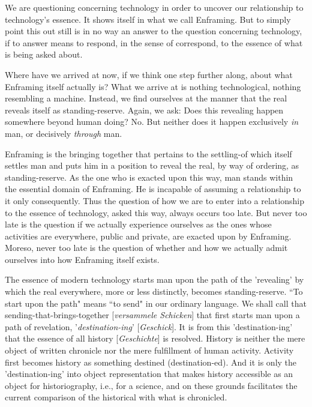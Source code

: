 \documentclass[12pt]{article}
\begin{document}
We are questioning concerning technology in order to uncover our relationship to technology's essence. It shows itself in what we call Enframing. But to simply point this out still is in no way an answer to the question concerning technology, if to answer means to respond, in the sense of correspond, to the essence of what is being asked about.

Where have we arrived at now, if we think one step further along, about what Enframing itself actually is? What we arrive at is nothing technological, nothing resembling a machine. Instead, we find ourselves at the manner that the real reveals itself as standing-reserve. Again, we ask: Does this revealing happen somewhere beyond human doing? No. But neither does it happen exclusively \textit{in} man, or decisively \textit{through} man.

Enframing is the bringing together that pertains to the settling-of which itself settles man and puts him in a position to reveal the real, by way of ordering, as standing-reserve. As the one who is exacted upon this way, man stands within the essential domain of Enframing. He is incapable of assuming a relationship to it only consequently. Thus the question of how we are to enter into a relationship to the essence of technology, asked this way, always occurs too late. But never too late is the question if we actually experience ourselves as the ones whose activities are everywhere, public and private, are exacted upon by Enframing. Moreso, never too late is the question of whether and how we actually admit ourselves into how Enframing itself exists.

The essence of modern technology starts man upon the path of the 'revealing' by which the real everywhere, more or less distinctly, becomes standing-reserve. ``To start upon the path" means ``to send" in our ordinary language. We shall call that sending-that-brings-together [\textit{versammele Schicken}] that first starts man upon a path of revelation, '\textit{destination-ing}' [\textit{Geschick}]. It is from this 'destination-ing' that the essence of all history [\textit{Geschichte}] is resolved. History is neither the mere object of written chronicle nor the mere fulfillment of human activity. Activity first becomes history as something destined (destination-ed). And it is only the 'destination-ing' into object representation that makes history accessible as an object for historiography, i.e., for a science, and on these grounds facilitates the current comparison of the historical with what is chronicled.
\end{document}
